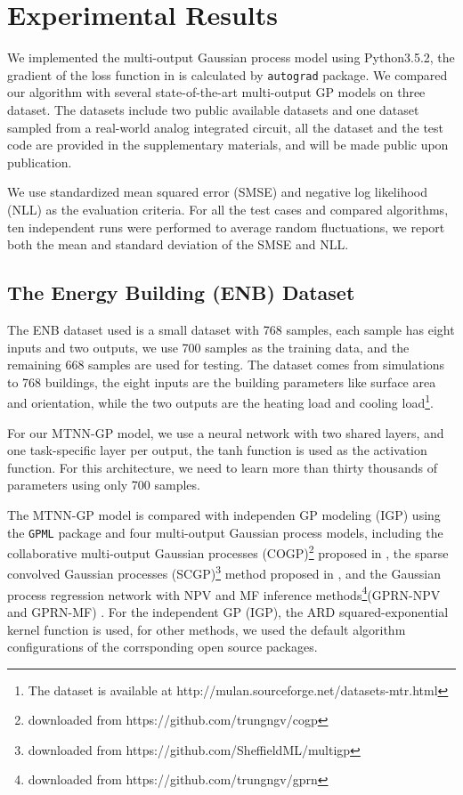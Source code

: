\section{Experimental Results}\label{sec:report}


We implemented the multi-output Gaussian process model using Python3.5.2, the gradient of the loss function in  is calculated by \texttt{autograd} package\cite{maclaurin2015autograd}. We compared our algorithm with several state-of-the-art multi-output GP models on three dataset. The datasets include two public available datasets and one dataset sampled from a real-world analog integrated circuit, all the dataset and the test code are provided in the supplementary materials, and will be made public upon publication.

We use standardized mean squared error (SMSE) and negative log likelihood (NLL) as the evaluation criteria. For all the test cases and compared algorithms, ten independent runs were performed to average random fluctuations, we report both the mean and standard deviation of the SMSE and NLL.

\subsection{The Energy Building (ENB) Dataset}\label{sec:enb}

The ENB dataset used is a small dataset with 768 samples, each sample has eight inputs and two outputs, we use 700 samples as the training data, and the remaining 668 samples are used for testing. The dataset comes from simulations to 768 buildings\cite{spyromitros2016multi, tsanas2012accurate}, the eight inputs are the building parameters like surface area and orientation, while the two outputs are the heating load and cooling load\footnote{The dataset is available at http://mulan.sourceforge.net/datasets-mtr.html}.

For our MTNN-GP model, we use a neural network with two shared layers, and one task-specific layer per output, the tanh function is used as the activation function. For this architecture, we need to learn more than thirty thousands of parameters using only 700 samples. 

The MTNN-GP model is compared with independen GP modeling (IGP) using the \texttt{GPML} package\cite{rasmussen2010gaussian} and four multi-output Gaussian process models, including the collaborative multi-output Gaussian processes (COGP)\footnote{downloaded from https://github.com/trungngv/cogp} proposed in \cite{nguyen2014collaborative}, the sparse convolved Gaussian processes (SCGP)\footnote{downloaded from https://github.com/SheffieldML/multigp} method proposed in \cite{alvarez2009sparse}, and the Gaussian process regression network with NPV and MF inference methods\footnote{downloaded from https://github.com/trungngv/gprn}(GPRN-NPV and GPRN-MF) \cite{nguyen2013efficient}. For the independent GP (IGP), the ARD squared-exponential kernel function is used, for other methods, we used the default algorithm configurations of the corrsponding open source packages.

